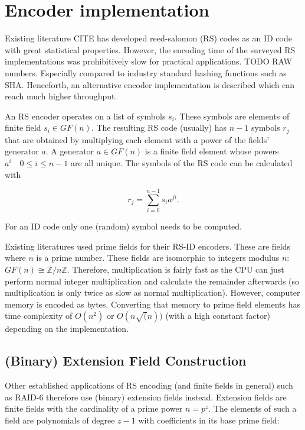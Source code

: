 \documentclass[
]{article}
\author{}
\date{}
\begin{document}
\hypertarget{encoder-implementation}{%
\section{Encoder implementation}\label{encoder-implementation}}

Existing literature CITE has developed reed-salomon (RS) codes as an ID
code with great statistical properties. However, the encoding time of
the surveyed RS implementations was prohibitively slow for practical
applications. TODO RAW numbers. Especially compared to industry standard
hashing functions such as SHA. Henceforth, an alternative encoder
implementation is described which can reach much higher throughput.

An RS encoder operates on a list of symbols \(s_i\). These symbols are
elements of finite field \(s_i \in GF(n)\). The resulting RS code
(usually) has \(n - 1\) symbols \(r_j\) that are obtained by multiplying
each element with a power of the fields' generator \(a\). A generator
\(a \in GF(n)\) is a finite field element whose powers
\(a^i \quad 0 \le i \le n - 1\) are all unique. The symbols of the RS
code can be calculated with

\begin{equation}
r_j = \sum_{i=0}^{n - 1} s_i a^{j i}.
\end{equation}

For an ID code only one (random) symbol needs to be computed.

Existing literatures used prime fields for their RS-ID encoders. These
are fields where \(n\) is a prime number. These fields are isomorphic to
integers modulus \(n\): \(GF(n) \cong \mathbb{Z} / n\mathbb{Z}\).
Therefore, multiplication is fairly fast as the CPU can just perform
normal integer multiplication and calculate the remainder afterwards (so
multiplication is only twice as slow as normal multiplication). However,
computer memory is encoded as bytes. Converting that memory to prime
field elements has time complexity of \(O(n^2)\) or \(O(n\sqrt(n))\)
(with a high constant factor) depending on the implementation.

\hypertarget{binary-extension-field-construction}{%
\subsection{(Binary) Extension Field
Construction}\label{binary-extension-field-construction}}

Other established applications of RS encoding (and finite fields in
general) such as RAID-6 therefore use (binary) extension fields instead.
Extension fields are finite fields with the cardinality of a prime power
\(n = p^z\). The elements of such a field are polynomials of degree
\(z - 1\) with coefficients in its base prime field:
\end{document}
